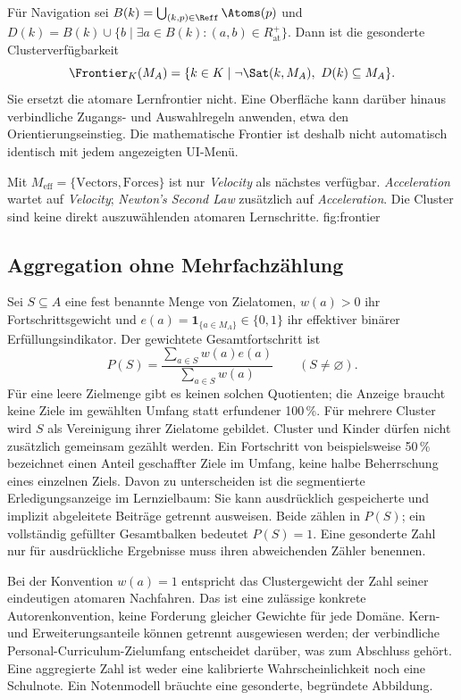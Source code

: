 Für Navigation sei $B(k)=\bigcup_{(k,p)\in\Reff}\Atoms(p)$ und
$D(k)=B(k)\cup\{b\mid\exists a\in B(k):(a,b)\in R_{\mathrm{at}}^+\}$.
Dann ist die gesonderte Clusterverfügbarkeit
\begin{equation}
 \Frontier_K(M_A)=\{k\in K\mid\neg\Sat(k,M_A),\ D(k)\subseteq M_A\}.
\end{equation}
Sie ersetzt die atomare Lernfrontier nicht. Eine Oberfläche kann darüber
hinaus verbindliche Zugangs- und Auswahlregeln anwenden, etwa den
Orientierungseinstieg. Die mathematische Frontier ist deshalb nicht
automatisch identisch mit jedem angezeigten UI-Menü.

{Mit $M_{\mathrm{eff}}=\{\text{Vectors},\text{Forces}\}$ ist nur \emph{Velocity} als
nächstes verfügbar. \emph{Acceleration} wartet auf \emph{Velocity};
\emph{Newton's Second Law} zusätzlich auf \emph{Acceleration}.
Die Cluster sind keine direkt auszuwählenden atomaren Lernschritte.}
{fig:frontier}
\FloatBarrier

\subsection{Aggregation ohne Mehrfachzählung}
Sei $S\subseteq A$ eine fest benannte Menge von Zielatomen,
$w(a)>0$ ihr Fortschrittsgewicht und
$e(a)=\mathbf{1}_{\{a\in M_A\}}\in\{0,1\}$ ihr effektiver binärer
Erfüllungsindikator. Der gewichtete Gesamtfortschritt ist
\begin{equation}
 P(S)=\frac{\sum_{a\in S}w(a)e(a)}{\sum_{a\in S}w(a)}\qquad(S\ne\varnothing).
\end{equation}
Für eine leere Zielmenge gibt es keinen solchen Quotienten; die Anzeige
braucht \glqq keine Ziele im gewählten Umfang\grqq{} statt erfundener 100\,\%.
Für mehrere Cluster wird $S$ als Vereinigung ihrer Zielatome gebildet.
Cluster und Kinder dürfen nicht zusätzlich gemeinsam gezählt werden.
Ein Fortschritt von beispielsweise 50\,\% bezeichnet einen Anteil
geschaffter Ziele im Umfang, keine halbe Beherrschung eines einzelnen Ziels.
Davon zu unterscheiden ist die segmentierte Erledigungsanzeige im Lernzielbaum:
Sie kann ausdrücklich gespeicherte und implizit abgeleitete Beiträge
getrennt ausweisen. Beide zählen in $P(S)$; ein vollständig gefüllter
Gesamtbalken bedeutet $P(S)=1$. Eine gesonderte Zahl nur für ausdrückliche
Ergebnisse muss ihren abweichenden Zähler benennen.

Bei der Konvention $w(a)=1$ entspricht das Clustergewicht der Zahl seiner
eindeutigen atomaren Nachfahren. Das ist eine zulässige konkrete
Autorenkonvention, keine Forderung gleicher Gewichte für jede Domäne.
Kern- und Erweiterungsanteile können getrennt ausgewiesen werden; der
verbindliche Personal-Curriculum-Zielumfang entscheidet darüber, was zum
Abschluss gehört. Eine aggregierte Zahl ist weder eine kalibrierte
Wahrscheinlichkeit noch eine Schulnote. Ein Notenmodell bräuchte eine
gesonderte, begründete Abbildung.

